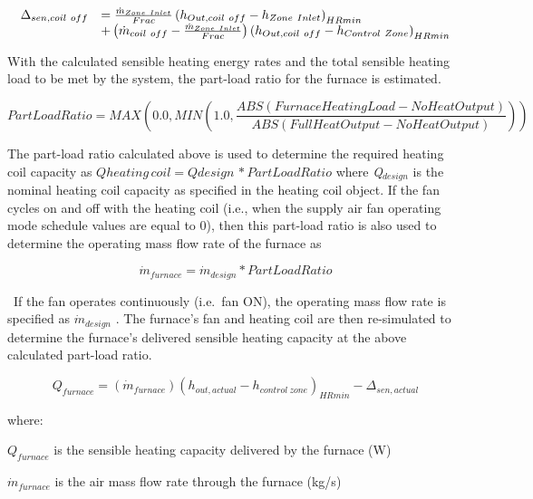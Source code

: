 \begin{equation}
  \begin{array}{rl}
    \Delta_{sen,coil~off} &= \frac{\dot{m}_{Zone~Inlet}}{Frac} \left(h_{Out,coil~off} - h_{Zone~Inlet}\right)_{HRmin} \\
                           &+ \left(\dot{m}_{coil~off} - \frac{\dot{m}_{Zone~Inlet}}{Frac}\right) \left(h_{Out,coil~off} - h_{Control~Zone}\right)_{HRmin}
  \end{array}
\end{equation}

With the calculated sensible heating energy rates and the total sensible heating load to be met by the system, the part-load ratio for the furnace is estimated.

\begin{equation}
PartLoadRatio = MAX\left( {0.0,MIN\left( {1.0,\frac{{ABS\left( {FurnaceHeatingLoad - NoHeatOutput} \right)}}{{ABS(FullHeatOutput - NoHeatOutput)}}} \right)} \right)
\end{equation}

The part-load ratio calculated above is used to determine the required heating coil capacity as \(Qheating\,coil = Qdesign\,*PartLoadRatio\) where \emph{Q\(_{design}\)} is the nominal heating coil capacity as specified in the heating coil object. If the fan cycles on and off with the heating coil (i.e., when the supply air fan operating mode schedule values are equal to 0), then this part-load ratio is also used to determine the operating mass flow rate of the furnace as

\begin{equation}
{\dot m_{furnace}} = {\dot m_{design}}*PartLoadRatio
\end{equation}

~If the fan operates continuously (i.e.~fan ON), the operating mass flow rate is specified as \({\dot m_{design}}\) . The furnace's fan and heating coil are then re-simulated to determine the furnace's delivered sensible heating capacity at the above calculated part-load ratio.

\begin{equation}
{Q_{furnace}} = \left( {{{\dot m}_{furnace}}} \right){\left( {{h_{out,actual}} - {h_{control~zone}}} \right)_{HRmin}} - {\Delta_{sen,actual}}
\end{equation}

where:

\({Q_{furnace}}\) is the sensible heating capacity delivered by the furnace (W)

\({\dot m_{furnace}}\) is the air mass flow rate through the furnace (kg/s)

